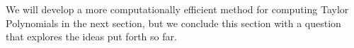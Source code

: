 \documentclass{ximera}
\begin{document}
We will develop a more computationally efficient method for computing Taylor Polynomials in the next section, but we conclude this section with a question that explores the ideas put forth so far.

%
%
%
%
%
%
%
%
%
\end{document}
